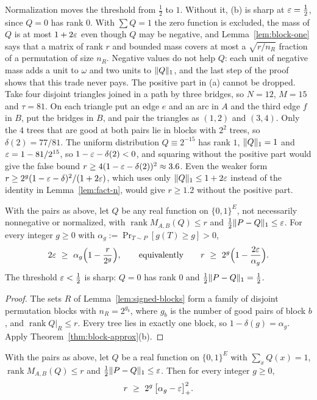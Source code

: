 Normalization moves the threshold from $\frac12$ to $1$. Without it, (b) is sharp at $\varepsilon=\frac12$, since $Q=0$ has rank $0$. With $\sum Q=1$ the zero function is excluded, the mass of $Q$ is at most $1+2\varepsilon$ even though $Q$ may be negative, and Lemma~\ref{lem:block-one} says that a matrix of rank $r$ and bounded mass covers at most a $\sqrt{r/n_R}$ fraction of a permutation of size $n_R$. Negative values do not help $Q$: each unit of negative mass adds a unit to $\omega$ and two units to $\lVert Q\rVert_1$, and the last step of the proof shows that this trade never pays. The positive part in (a) cannot be dropped. Take four disjoint triangles joined in a path by three bridges, so $N=12$, $M=15$ and $\tau=81$. On each triangle put an edge $e$ and an arc in $A$ and the third edge $f$ in $B$, put the bridges in $B$, and pair the triangles as $(1,2)$ and $(3,4)$. Only the $4$ trees that are good at both pairs lie in blocks with $2^2$ trees, so $\delta(2)=77/81$. The uniform distribution $Q\equiv2^{-15}$ has rank $1$, $\lVert Q\rVert_1=1$ and $\varepsilon=1-81/2^{15}$, so $1-\varepsilon-\delta(2)<0$, and squaring without the positive part would give the false bound $r\ge4(1-\varepsilon-\delta(2))^2\approx3.6$. Even the weaker form $r\ge2^g(1-\varepsilon-\delta)^2/(1+2\varepsilon)$, which uses only $\lVert Q\rVert_1\le1+2\varepsilon$ instead of the identity in Lemma~\ref{lem:fact-n}, would give $r\ge1.2$ without the positive part.

\begin{theorem}\label{thm:signed-approx}
With the pairs as above, let $Q$ be any real function on $\{0,1\}^E$, not necessarily nonnegative or normalized, with $\operatorname{rank}M_{A,B}(Q)\le r$ and $\frac12\lVert P-Q\rVert_1\le\varepsilon$. For every integer $g\ge0$ with $\alpha_g:=\Pr_{T\sim P}[g(T)\ge g]>0$,
\[
  2\eps\ \ge\ \alpha_g\Bigl(1-\frac r{2^g}\Bigr),\qquad\text{equivalently}\qquad r\ \ge\ 2^g\Bigl(1-\frac{2\eps}{\alpha_g}\Bigr).
\]
The threshold $\varepsilon<\frac12$ is sharp: $Q=0$ has rank $0$ and $\frac12\lVert P-Q\rVert_1=\frac12$.
\end{theorem}

\begin{proof}
The sets $R$ of Lemma~\ref{lem:signed-blocks} form a family of disjoint permutation blocks with $n_R=2^{g_b}$, where $g_b$ is the number of good pairs of block $b$, and $\operatorname{rank}Q|_R\le r$. Every tree lies in exactly one block, so $1-\delta(g)=\alpha_g$. Apply Theorem~\ref{thm:block-approx}(b).
\end{proof}

\begin{theorem}\label{thm:signed-o2}
With the pairs as above, let $Q$ be a real function on $\{0,1\}^E$ with $\sum_xQ(x)=1$, $\operatorname{rank}M_{A,B}(Q)\le r$ and $\frac12\lVert P-Q\rVert_1\le\varepsilon$. Then for every integer $g\ge0$,
\[
  r\ \ge\ 2^g\,\bigl[\alpha_g-\varepsilon\bigr]_+^2 .
\]
\end{theorem}

